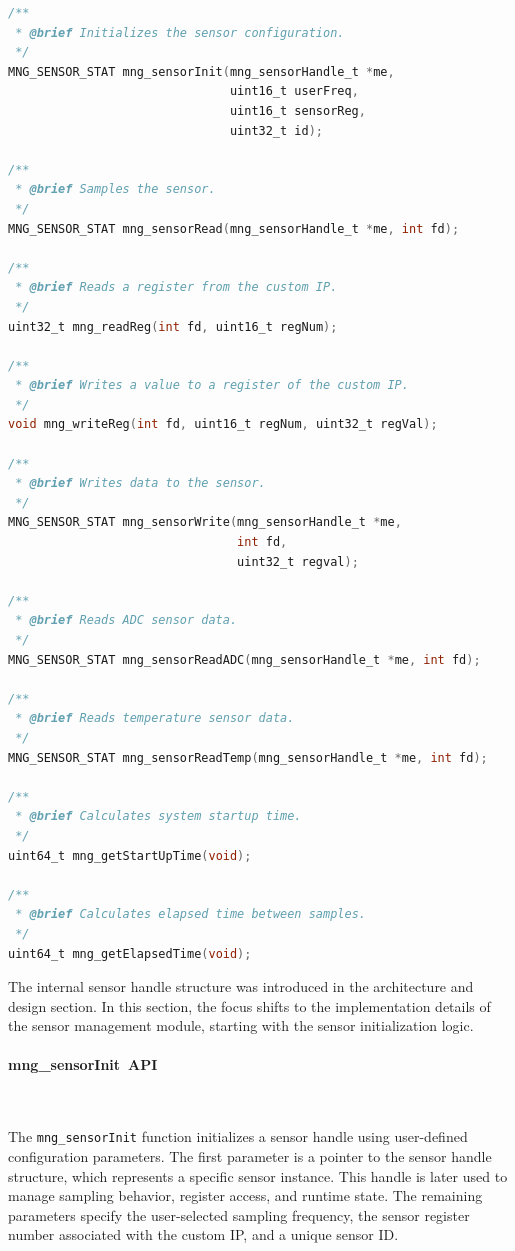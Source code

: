 \begin{lstlisting}[language=C,
caption={Sensor management module APIs},
label={lst:mng_sensor_api}]
/**
 * @brief Initializes the sensor configuration.
 */
MNG_SENSOR_STAT mng_sensorInit(mng_sensorHandle_t *me,
                               uint16_t userFreq,
                               uint16_t sensorReg,
                               uint32_t id);

/**
 * @brief Samples the sensor.
 */
MNG_SENSOR_STAT mng_sensorRead(mng_sensorHandle_t *me, int fd);

/**
 * @brief Reads a register from the custom IP.
 */
uint32_t mng_readReg(int fd, uint16_t regNum);

/**
 * @brief Writes a value to a register of the custom IP.
 */
void mng_writeReg(int fd, uint16_t regNum, uint32_t regVal);

/**
 * @brief Writes data to the sensor.
 */
MNG_SENSOR_STAT mng_sensorWrite(mng_sensorHandle_t *me,
                                int fd,
                                uint32_t regval);

/**
 * @brief Reads ADC sensor data.
 */
MNG_SENSOR_STAT mng_sensorReadADC(mng_sensorHandle_t *me, int fd);

/**
 * @brief Reads temperature sensor data.
 */
MNG_SENSOR_STAT mng_sensorReadTemp(mng_sensorHandle_t *me, int fd);

/**
 * @brief Calculates system startup time.
 */
uint64_t mng_getStartUpTime(void);

/**
 * @brief Calculates elapsed time between samples.
 */
uint64_t mng_getElapsedTime(void);
\end{lstlisting}

The internal sensor handle structure was introduced in the architecture and design 
section. In this section, the focus shifts to the implementation details of the sensor 
management module, starting with the sensor initialization logic.

\paragraph{mng\_sensorInit\ API}\

The \texttt{mng\_sensorInit} function initializes a sensor handle using user-defined 
configuration parameters. The first parameter is a pointer to the sensor handle structure, 
which represents a specific sensor instance. This handle is later used to manage sampling 
behavior, register access, and runtime state. The remaining parameters specify the 
user-selected sampling frequency, the sensor register number associated with the 
custom IP, and a unique sensor ID.

